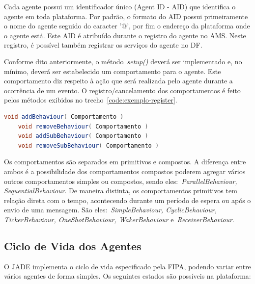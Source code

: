 Cada agente possui um identificador único (Agent ID - AID) que identifica o agente em toda plataforma. Por padrão, o formato do AID possui primeiramente o nome do agente seguido do caracter '@', por fim o endereço da plataforma onde o agente está. Este AID é atribuído durante o registro do agente no AMS. Neste registro, é possível também registrar os serviços do agente no DF.

Conforme dito anteriormente, o método~\emph{setup()} deverá ser implementado e, no mínimo, deverá ser estabelecido um comportamento para o agente. Este comportamento diz respeito à ação que será realizada pelo agente durante a ocorrência de um evento. O registro/cancelamento dos comportamentos é feito pelos métodos exibidos no trecho~\ref{code:exemplo-register}.

\begin{lstlisting}[language=java,label=code:exemplo-register,caption=Exemplo de registro de comportamento nos agentes.]
	void addBehaviour( Comportamento )
	void removeBehaviour( Comportamento )
	void addSubBehaviour( Comportamento )
	void removeSubBehaviour( Comportamento )
\end{lstlisting}

Os comportamentos são separados em primitivos e compostos. A diferença entre ambos é a possibilidade dos comportamentos compostos poderem agregar vários outros comportamentos simples ou compostos, sendo eles:~\emph{ParallelBehaviour, SequentialBehaviour}. De maneira distinta, os comportamentos primitivos tem relação direta com o tempo, acontecendo durante um período de espera ou após o envio de uma mensagem. São eles:~\emph{SimpleBehaviour, CyclicBehaviour, TickerBehaviour, OneShotBehaviour, WakerBehaviour} e~\emph{ReceiverBehaviour}.

\subsection{Ciclo de Vida dos Agentes}
O JADE implementa o ciclo de vida especificado pela FIPA, podendo variar entre vários agentes de forma simples. Os seguintes estados são possíveis na plataforma:

